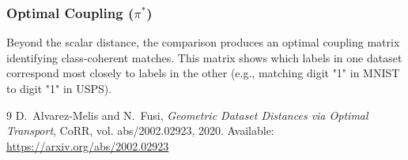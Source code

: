 \documentclass[11pt, a4paper]{article}
\theoremstyle{plain} %
\theoremstyle{definition} %
\begin{document}
			\subsubsection{Optimal Coupling ($\pi^*$)}
			\label{sec:optimal_coupling}
				Beyond the scalar distance, the comparison produces an optimal coupling matrix identifying class-coherent matches. This matrix shows which labels in one dataset correspond most closely to labels in the other (e.g., matching digit "1" in MNIST to digit "1" in USPS).


	\begin{thebibliography}{9}
		D.~Alvarez-Melis and N.~Fusi,
		\textit{Geometric Dataset Distances via Optimal Transport},
		CoRR, vol. abs/2002.02923, 2020.
		Available: \url{https://arxiv.org/abs/2002.02923}
	\end{thebibliography}
\end{document}
